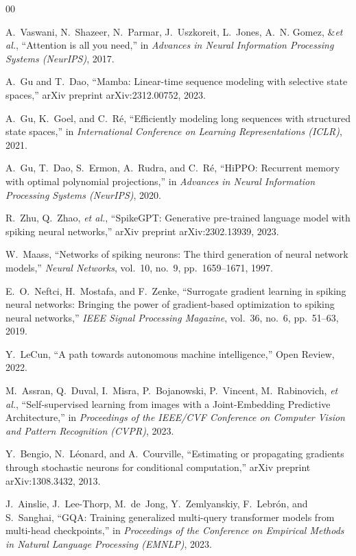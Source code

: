 \documentclass[conference]{IEEEtran}
\begin{document}
\begin{thebibliography}{00}

A.~Vaswani, N.~Shazeer, N.~Parmar, J.~Uszkoreit, L.~Jones, A.~N. Gomez,
\&\emph{et al.}, ``Attention is all you need,'' in \emph{Advances in Neural Information Processing Systems (NeurIPS)}, 2017.

A.~Gu and T.~Dao, ``Mamba: Linear-time sequence modeling with selective state spaces,'' arXiv preprint arXiv:2312.00752, 2023.

A.~Gu, K.~Goel, and C.~R\'e, ``Efficiently modeling long sequences with structured state spaces,'' in \emph{International Conference on Learning Representations (ICLR)}, 2021.

A.~Gu, T.~Dao, S.~Ermon, A.~Rudra, and C.~R\'e, ``HiPPO: Recurrent memory with optimal polynomial projections,'' in \emph{Advances in Neural Information Processing Systems (NeurIPS)}, 2020.

R.~Zhu, Q.~Zhao, \emph{et al.}, ``SpikeGPT: Generative pre-trained language model with spiking neural networks,'' arXiv preprint arXiv:2302.13939, 2023.

W.~Maass, ``Networks of spiking neurons: The third generation of neural network models,'' \emph{Neural Networks}, vol.~10, no.~9, pp.~1659--1671, 1997.

E.~O.~Neftci, H.~Mostafa, and F.~Zenke, ``Surrogate gradient learning in spiking neural networks: Bringing the power of gradient-based optimization to spiking neural networks,'' \emph{IEEE Signal Processing Magazine}, vol.~36, no.~6, pp.~51--63, 2019.

Y.~LeCun, ``A path towards autonomous machine intelligence,'' Open Review, 2022.

M.~Assran, Q.~Duval, I.~Misra, P.~Bojanowski, P.~Vincent, M.~Rabinovich, \emph{et al.}, ``Self-supervised learning from images with a Joint-Embedding Predictive Architecture,'' in \emph{Proceedings of the IEEE/CVF Conference on Computer Vision and Pattern Recognition (CVPR)}, 2023.

Y.~Bengio, N.~L\'{e}onard, and A.~Courville, ``Estimating or propagating gradients through stochastic neurons for conditional computation,'' arXiv preprint arXiv:1308.3432, 2013.

J.~Ainslie, J.~Lee-Thorp, M.~de~Jong, Y.~Zemlyanskiy, F.~Lebr\'{o}n, and S.~Sanghai, ``GQA: Training generalized multi-query transformer models from multi-head checkpoints,'' in \emph{Proceedings of the Conference on Empirical Methods in Natural Language Processing (EMNLP)}, 2023.


\end{thebibliography}
\end{document}
